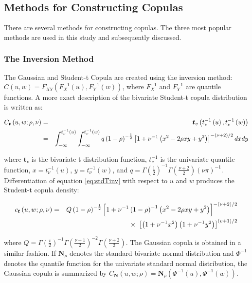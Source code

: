 \documentclass[12pt]{article}
\begin{document}
\subsection{Methods for Constructing Copulas}

There are several methods for constructing copulas. The three most popular methods are used in this study and subsequently discussed.

\subsubsection{The Inversion Method}

The Gaussian and Student-t Copula are created using the inversion method: $C\left(u,w\right) = F_{XY}\left(F_{X}^{-1}\left(u\right),F_{Y}^{-1}\left(w\right)\right)$, where $F_{X}^{-1}$ and $F_{Y}^{-1}$ are quantile functions. A more exact description of the bivariate Student-t copula distribution is written as:

\begin{eqnarray} \label{eq:stdTinv}
	C_{\boldsymbol{t}}\left(u,w;\rho,\nu\right) &=& \boldsymbol{t}_{v}\left(t_{\nu}^{-1}\left(u\right), t_{\nu}^{-1}\left(w\right)\right) \\
	&=& \int_{-\infty}^{t_{\nu}^{-1}\left(u\right)}\int_{-\infty}^{t_{\nu}^{-1}\left(w\right)}q\left(1-\rho\right)^{-\frac{1}{2}}\left[1+\nu^{-1}\left(x^{2}-2\rho xy + y^{2}\right)\right]^{-\left(\nu + 2\right)
	/2}dxdy \notag
\end{eqnarray}

where $\boldsymbol{t}_{v}$ is the bivariate t-distribution function, $t_{\nu}^{-1}$ is the univariate quantile function, $x = t_{\nu}^{-1}\left(u\right)$, $y = t_{\nu }^{-1}\left(w\right)$, and $q = \Gamma\left(\frac{1}{2}\right)^{-1}\Gamma\left(\frac{\nu +2}{2}\right)\left(\nu\pi\right)^{-1}$. Differentiation of equation \ref{eq:stdTinv} with respect to $u$ and $w$ produces the Student-t copula density:

\begin{eqnarray}
	c_{\boldsymbol{t}}\left(u,w;\rho,\nu\right) &=& Q\left(1-\rho\right)^{-\frac{1}{2}}\left[1+\nu^{-1}\left(1-\rho\right)^{-1}\left(x^{2}-2\rho xy+y^{2}\right)\right]^{-\left(\nu +2\right)/2} \notag \\
	&& \times~\left[\left(1+\nu^{-1}x^{2}\right)\left(1+\nu^{-1}y^{2}\right)\right]^{\left(v+1\right)/2}
\end{eqnarray}

where $Q=\Gamma\left(\frac{v}{2}\right)^{-1}\Gamma\left(\frac{\nu +1}{2}\right)^{-2}\Gamma\left(\frac{\nu +2}{2}\right)$. The Gaussian copula is obtained in a similar fashion. If $\boldsymbol{N}_{\rho}$ denotes the standard bivariate normal distribution and $\Phi^{-1}$ denotes the quantile function for the univariate standard normal distribution, the Gaussian copula is summarized by $C_{\boldsymbol{N}}\left(u,w;\rho\right) = \boldsymbol{N}_{\rho}\left(\Phi^{-1}\left(u\right),\Phi^{-1}\left(w\right)\right)$.
\end{document}
